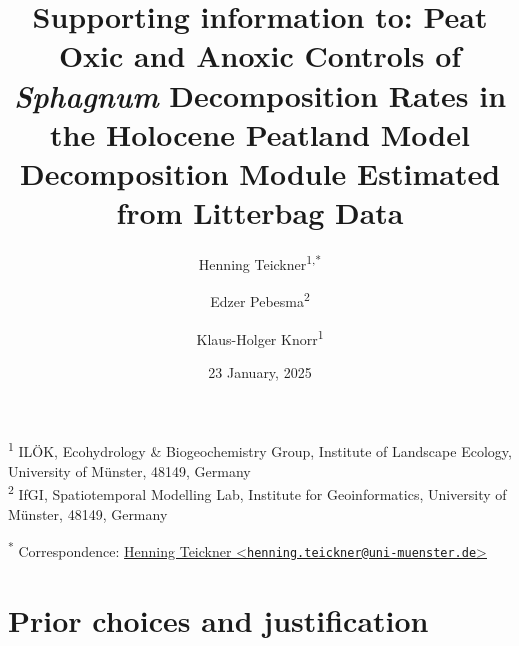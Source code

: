\documentclass[
  12pt,
]{article}
\title{Supporting information to: Peat Oxic and Anoxic Controls of \emph{Sphagnum} Decomposition Rates in the Holocene Peatland Model Decomposition Module Estimated from Litterbag Data}
\author{Henning Teickner\textsuperscript{1,*} \and Edzer Pebesma\textsuperscript{2} \and Klaus-Holger Knorr\textsuperscript{1}}
\date{23 January, 2025}
\begin{document}
\maketitle

{
\setcounter{tocdepth}{2}
\tableofcontents
}
\textsuperscript{1} ILÖK, Ecohydrology \& Biogeochemistry Group, Institute of Landscape Ecology, University of Münster, 48149, Germany\\
\textsuperscript{2} IfGI, Spatiotemporal Modelling Lab, Institute for Geoinformatics, University of Münster, 48149, Germany

\textsuperscript{*} Correspondence: \href{mailto:henning.teickner@uni-muenster.de}{Henning Teickner \textless{}\href{mailto:henning.teickner@uni-muenster.de}{\nolinkurl{henning.teickner@uni-muenster.de}}\textgreater{}}

\renewcommand{\thefigure}{S\arabic{figure}} 
\renewcommand{\thetable}{S\arabic{table}}
\renewcommand{\thesection}{S\arabic{section}}
\renewcommand{\theequation}{S\arabic{equation}}

\hypertarget{sup-2}{%
\section{Prior choices and justification}\label{sup-2}}
\end{document}
